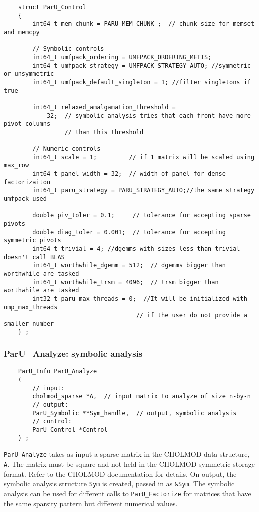 \documentclass[12pt]{article}
\begin{document}
    {\footnotesize
    \begin{verbatim}
    struct ParU_Control
    {
        int64_t mem_chunk = PARU_MEM_CHUNK ;  // chunk size for memset and memcpy

        // Symbolic controls
        int64_t umfpack_ordering = UMFPACK_ORDERING_METIS;
        int64_t umfpack_strategy = UMFPACK_STRATEGY_AUTO; //symmetric or unsymmetric
        int64_t umfpack_default_singleton = 1; //filter singletons if true

        int64_t relaxed_amalgamation_threshold =
            32;  // symbolic analysis tries that each front have more pivot columns
                 // than this threshold

        // Numeric controls
        int64_t scale = 1;         // if 1 matrix will be scaled using max_row
        int64_t panel_width = 32;  // width of panel for dense factorizaiton
        int64_t paru_strategy = PARU_STRATEGY_AUTO;//the same strategy umfpack used

        double piv_toler = 0.1;     // tolerance for accepting sparse pivots
        double diag_toler = 0.001;  // tolerance for accepting symmetric pivots
        int64_t trivial = 4; //dgemms with sizes less than trivial doesn't call BLAS
        int64_t worthwhile_dgemm = 512;  // dgemms bigger than worthwhile are tasked
        int64_t worthwhile_trsm = 4096;  // trsm bigger than worthwhile are tasked
        int32_t paru_max_threads = 0;  //It will be initialized with omp_max_threads
                                     // if the user do not provide a smaller number
    } ; \end{verbatim}}

\subsubsection{{\sf ParU\_Analyze}: symbolic analysis}

    {\footnotesize
    \begin{verbatim}
    ParU_Info ParU_Analyze
    (
        // input:
        cholmod_sparse *A,  // input matrix to analyze of size n-by-n
        // output:
        ParU_Symbolic **Sym_handle,  // output, symbolic analysis
        // control:
        ParU_Control *Control
    ) ; \end{verbatim}}

    \verb'ParU_Analyze' takes as input a sparse matrix in the CHOLMOD data
    structure, \verb'A'.  The matrix must be square and not held in the CHOLMOD
    symmetric storage format.  Refer to the CHOLMOD documentation for details.
    On output, the symbolic analysis structure \verb'Sym' is created, passed in as
    \verb'&Sym'.  The symbolic analysis can be used for different calls to
    \verb'ParU_Factorize' for matrices that have the same sparsity pattern but
    different numerical values.
\end{document}

